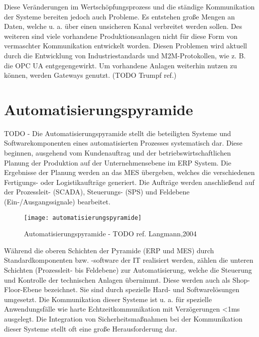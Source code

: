 Diese Veränderungen im Wertschöpfungsprozess und die ständige Kommunikation der Systeme bereiten jedoch auch Probleme. Es entstehen große Mengen an Daten, welche u. a. über einen unsicheren Kanal verbreitet werden sollen. Des weiteren sind viele vorhandene Produktionsanlagen nicht für diese Form von vermaschter Kommunikation entwickelt worden. Diesen Problemen wird aktuell durch die Entwicklung von Industriestandards und \ac{M2M}-Protokollen, wie z. B. die \ac{OPC UA} entgegengewirkt. Um vorhandene Anlagen weiterhin nutzen zu können, werden Gateways genutzt. (TODO Trumpf ref.)

\section{Automatisierungspyramide}
\label{Grundlagen:Automatisierungspyramide}
TODO - 
Die Automatisierungspyramide stellt die beteiligten Systeme und Softwarekomponenten eines automatisierten Prozesses systematisch dar. Diese beginnen, ausgehend vom Kundenauftrag und der betriebswirtschaftlichen Planung der Produktion auf der Unternehmensebene im \ac{ERP} System. Die Ergebnisse der Planung werden an das \ac{MES} übergeben, welches die verschiedenen Fertigungs- oder Logistikaufträge generiert. Die Aufträge werden anschließend auf der Prozessleit- (\ac{SCADA}), Steuerungs- (\ac{SPS}) und Feldebene (Ein-/Ausgangssignale) bearbeitet.

\begin{figure}[h]
  \centering
  \texttt{[image: automatisierungspyramide]}
  \caption{Automatisierungspyramide - TODO ref. Langmann,2004}
  \label{Kap2:Automatisierungspyramide}
\end{figure}

\clearpage

Während die oberen Schichten der Pyramide (\ac{ERP} und \ac{MES}) durch Standardkomponenten bzw. -software der IT realisiert werden, zählen die unteren Schichten (Prozessleit- bis Feldebene) zur Automatisierung, welche die Steuerung und Kontrolle der technischen Anlagen übernimmt. Diese werden auch als Shop-Floor-Ebene bezeichnet. Sie sind durch spezielle Hard- und Softwarelösungen umgesetzt. Die Kommunikation dieser Systeme ist u. a. für spezielle Anwendungsfälle wie harte Echtzeitkommunikation mit Verzögerungen <1ms ausgelegt. Die Integration von Sicherheitsmaßnahmen bei der Kommunikation dieser Systeme stellt oft eine große Herausforderung dar.

